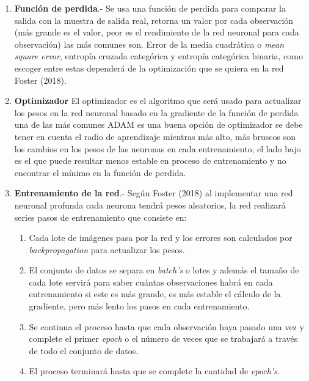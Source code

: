 \documentclass[letter, openright, 12pt]{book}
\begin{document}
\begin{enumerate}[label=(\alph*)]
\item \textbf{Función de perdida}.- Se usa una función de perdida para comparar la salida con la muestra de salida real, retorna un valor por cada observación (más grande es el valor, peor es el rendimiento de la red neuronal para cada observación) las más comunes son. Error de la media cuadrática o \textit{mean square error}, entropía cruzada categórica y entropía categórica binaria, como escoger entre estas dependerá de la optimización que se quiera en la red Foster (2018).

\item \textbf{Optimizador} El optimizador es el algoritmo que será usado para actualizar los pesos en la red neuronal basado en la gradiente de la función de perdida una de las más comunes ADAM es una buena opción de optimizador se debe tener en cuenta el radio de aprendizaje mientras más alto, más bruscos son los cambios en los pesos de las neuronas en cada entrenamiento, el lado bajo es el que puede resultar menos estable en proceso de entrenamiento y no encontrar el mínimo en la función de perdida.

\item \textbf{Entrenamiento de la red}.- Según Foster (2018) al implementar una red neuronal profunda cada neurona tendrá pesos aleatorios, la red realizará series pasos de entrenamiento que consiste en:

\begin{enumerate}
\item Cada lote de imágenes pasa por la red y los errores son calculados por \textit{backpropagation} para actualizar los pesos.
\item El conjunto de datos se separa en \textit{batch’s} o lotes y además el tamaño de cada lote servirá para saber cuántas observaciones habrá en cada entrenamiento si este es más grande, es más estable el cálculo de la gradiente, pero más lento los pasos en cada entrenamiento.
\item Se continua el proceso hasta que cada observación haya pasado una vez y complete el primer \textit{epoch} o el número de veces que se trabajará a través de todo el conjunto de datos.
\item El proceso terminará hasta que se complete la cantidad de \textit{epoch’s}.
\end{enumerate}

\end{enumerate}
\end{document}
